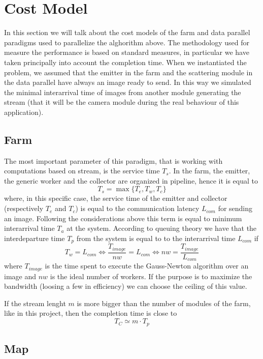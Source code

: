 \section{Cost Model}

In this section we will talk about the cost models of the farm and data parallel paradigms used to parallelize the alghorithm above. The methodology used for measure the performance is based on standard measures, in particular we have taken principally into account the completion time. When we instantiated the problem, we assumed that the emitter in the farm and the scattering module in the data parallel have always an image ready to send. In this way we simulated the minimal interarrival time of images from another module generating the stream (that it will be the camera module during the real behaviour of this application).

\subsection{Farm}

The most important parameter of this paradigm, that is working with computations based on stream, is the service time $T_{s}$. In the farm, the emitter, the generic worker and the collector are organized in pipeline, hence it is equal to
\[
T_{s} = \max \lbrace T_{e}, T_{w}, T_{c}\rbrace
\]
where, in this specific case, the service time of the emitter and collector (respectively $T_{e}$ and $T_{c}$) is equal to the communication latency $L_{com}$ for sending an image. Following the considerations above this term is equal to minimum interarrival time $T_{a}$ at the system. According to queuing theory we have that the interdeparture time $T_{p}$ from the system is equal to to the interarrival time $L_{com}$ if
\[
T_{w} = L_{com} \Leftrightarrow \frac{T_{image}}{nw} = L_{com} \Leftrightarrow nw = \frac{T_{image}}{L_{com}} 
\]
where $T_{image}$ is the time spent to execute the Gauss-Newton algorithm over an image and $nw$ is the ideal number of workers. If the purpose is to maximize the bandwidth (loosing a few in efficiency) we can choose the ceiling of this value.

If the stream lenght $m$ is more bigger than the number of modules of the farm, like in this project, then the completion time is close to
\[
T_{C} \simeq m \cdot T_{p} 
\]
\subsection{Map}